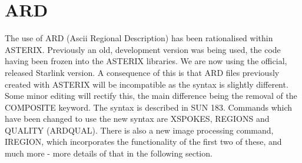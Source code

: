 \documentclass{book}
\renewcommand{\_}{{\tt\char'137}}     %
\begin{document}
\section{ARD}
The use of ARD (Ascii Regional Description) has been rationalised
within ASTERIX. Previously an old, development version was being
used, the code having been frozen into the ASTERIX libraries. We
are now using the official, released Starlink version. A
consequence of this is that ARD files previously created with
ASTERIX will be incompatible as the syntax is slightly different.
Some minor editing will rectify this, the main difference being
the removal of the COMPOSITE keyword. The syntax is described in
SUN 183. Commands which have been changed to use the new syntax
are XSPOKES, REGIONS and QUALITY (ARDQUAL). There is also a new
image processing command, IREGION, which incorporates the
functionality of the first two of these, and much more - more
details of that in the following section.
 
\end{document}

